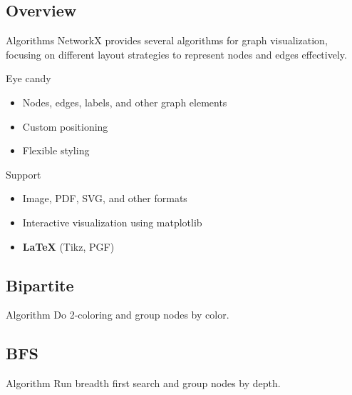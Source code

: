 \documentclass[11pt]{beamer}
\begin{document}
\subsection{Overview}
\begin{frame}{\subsecname}
    \begin{block}{Algorithms}
        NetworkX provides several algorithms for graph visualization, focusing
        on different layout strategies to represent nodes and edges effectively.
    \end{block}

    \pause
    \begin{block}{Eye candy}
        \begin{itemize}
            \pause
            \item Nodes, edges, labels, and other graph elements
            \pause
            \item Custom positioning
            \pause
            \item Flexible styling
        \end{itemize}
    \end{block}

    \pause
    \begin{block}{Support}
        \begin{itemize}
            \pause
            \item Image, PDF, SVG, and other formats
            \pause
            \item Interactive visualization using matplotlib
            \pause
            \item \textbf{LaTeX} (Tikz, PGF)
        \end{itemize}
    \end{block}
\end{frame}

\subsection{Bipartite}
\begin{frame}{\subsecname}

    \begin{block}{Algorithm}
        Do 2-coloring and group nodes by color.
    \end{block}

    \pause
    \resizebox{0.8\textwidth}{!}{}
\end{frame}

\subsection{BFS}
\begin{frame}{\subsecname}

    \begin{block}{Algorithm}
        Run breadth first search and group nodes by depth.
    \end{block}

    \pause
    \resizebox{0.8\textwidth}{!}{}

\end{frame}
\end{document}
